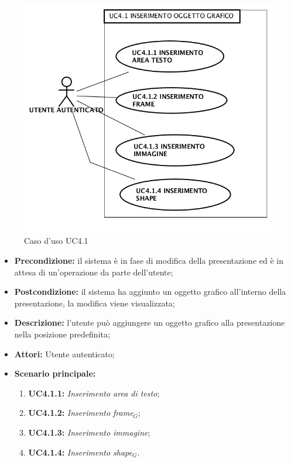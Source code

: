 \begin{figure}[h]
	\begin{center}
	\includegraphics[scale=0.4]{diagram/UC4-1.png}
	\caption{Caso d'uso UC4.1}
	\end{center}
\end{figure}
\begin{itemize}
	\item \textbf{Precondizione:} il sistema è in fase di modifica della presentazione ed è in attesa di un'operazione da parte dell'utente;
	\item \textbf{Postcondizione:} il sistema ha aggiunto un oggetto grafico all'interno della presentazione, la modifica viene visualizzata;
	\item \textbf{Descrizione:} l'utente può aggiungere un oggetto grafico alla presentazione nella posizione predefinita;
	\item \textbf{Attori:} Utente autenticato;
	\item \textbf{Scenario principale:}
	\begin{enumerate}
		\item \textbf{ UC4.1.1:} \textit{ Inserimento area di testo};
		\item \textbf{ UC4.1.2:} \textit{ Inserimento frame$_G$};
		\item \textbf{ UC4.1.3:} \textit{ Inserimento immagine};
		\item \textbf{ UC4.1.4:} \textit{ Inserimento shape$_G$}.
	\end{enumerate}
\end{itemize}
